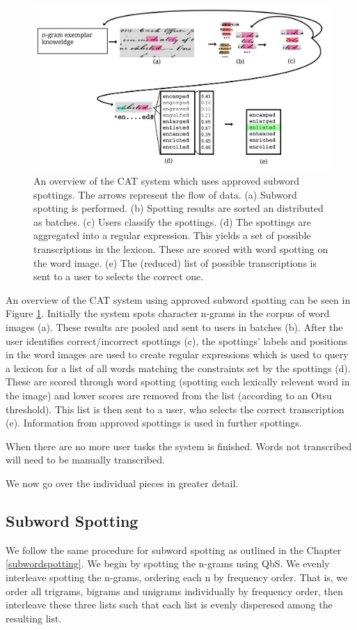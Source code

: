 \documentclass[ms,electronic,twosidetoc,letterpaper,chaptercenter,parttop,lof,lot]{byumsphd}
\begin{document}
\begin{figure}
    \centering
    \includegraphics[width=.9\textwidth]{flow6}
    \caption{An overview of the CAT system which uses approved subword spottings. The arrows represent the flow of data. (a) Subword spotting is performed. (b) Spotting results are sorted an distributed as batches. (c) Users classify the spottings. (d) The spottings are aggregated into a regular expression. This yields a set of possible transcriptions in the lexicon. These are scored with word spotting on the word image. (e) The (reduced) list of possible transcriptions is sent to a user to selects the correct one.}
    \label{fig:flow}
\end{figure}
An overview of the CAT system using approved subword spotting can be seen in Figure \ref{fig:flow}.  Initially the system spots character n-grams in the corpus of word images (a). These results are pooled and sent to users in batches (b). After the user identifies correct/incorrect spottings (c), the spottings' labels and positions in the word images are used to create regular expressions which is used to query a lexicon for a list of all words matching the constraints set by the spottings (d). These are scored through word spotting (spotting each lexically relevent word in the image) and lower scores are removed from the list (according to an Otsu threshold). This list is then sent to a user, who selects the correct transcription (e). Information from approved spottings is used in further spottings.

When there are no more user tasks the system is finished. Words not transcribed will need to be manually transcribed.

We now go over the individual pieces in greater detail.

\subsection{Subword Spotting}
We follow the same procedure for subword spotting as outlined in the Chapter \ref{subwordspotting}. We begin by spotting the n-grams using QbS. We evenly interleave spotting the n-grams, ordering each n by frequency order. That is, we order all trigrams, bigrams and unigrams individually by frequency order, then interleave these three lists such that each list is evenly disperesed among the resulting list. 
\end{document}
